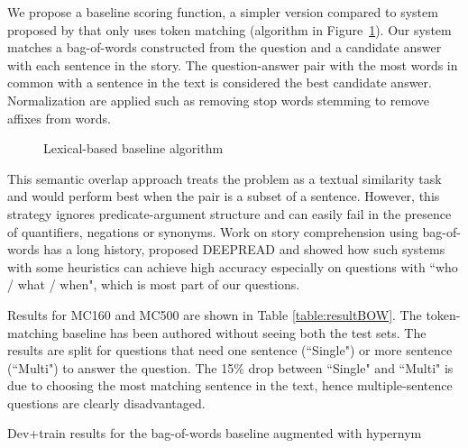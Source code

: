 We propose a baseline scoring function, a simpler version compared to system proposed by  that only uses token matching (algorithm in Figure~\ref{fig:algoBOW}). Our system matches a bag-of-words constructed from the question and a candidate answer with each sentence in the story. The question-answer pair with the most words in common with a sentence in the text is considered the best candidate answer. Normalization are applied such as removing stop words stemming to remove affixes from words.

\begin{figure}[!th]

\caption{\label{fig:algoBOW} Lexical-based baseline algorithm }
\end{figure}

This semantic overlap approach treats the problem as a textual similarity task and would perform best when the pair is a subset of a sentence. However, this strategy ignores predicate-argument structure and can easily fail in the presence of quantifiers, negations or synonyms. Work on story comprehension using bag-of-words has a long history,  proposed D{\small EEP}R{\small EAD} and showed how such systems with some heuristics can achieve high accuracy especially on questions with ``who / what / when", which is most part of our questions.

Results for MC160 and MC500 are shown in Table \ref{table:resultBOW}. The token-matching baseline has been authored without seeing both the test sets. The results are split for questions that need one sentence (``Single") or more sentence (``Multi") to answer the question. The 15\% drop between ``Single" and ``Multi" is due to choosing the most matching sentence in the text, hence multiple-sentence questions are clearly disadvantaged.

\begin{table}[!th]
\centering

\caption{\label{table:resultBOW}Dev+train results for the bag-of-words baseline augmented with hypernym}
\end{table}
